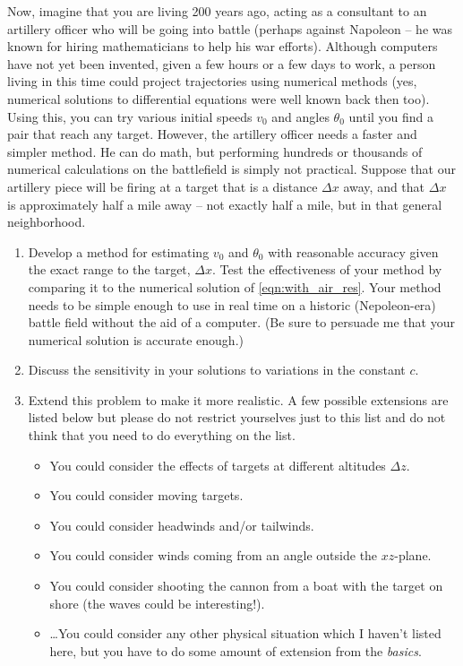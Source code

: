 Now, imagine that you are living 200 years ago, acting as a consultant to an artillery
officer who will be going into battle (perhaps against Napoleon -- he was known for hiring
mathematicians to help his war efforts). Although computers have
not yet been invented, given a few hours or a few days to work, a person living in this
time could project trajectories using numerical methods (yes, numerical solutions to differential
equations were well known back then too). Using this, you can try various
initial speeds $v_0$ and angles $\theta_0$ until you find a pair that reach any target. However, the
artillery officer needs a faster and simpler method. He can do math, but performing
hundreds or thousands of numerical calculations on the battlefield is simply not
practical. Suppose that our artillery piece will be firing at a target that is a distance
$\Delta x$ away, and that $\Delta x$ is approximately half a mile away -- not exactly half a mile, but in
that general neighborhood. 
\begin{enumerate}
    \item Develop a method for estimating $v_0$ and $\theta_0$ with reasonable
        accuracy given the exact range to the target, $\Delta x$.  Test the
        effectiveness of your method by comparing it to the numerical solution of
        \eqref{eqn:with_air_res}.  Your method needs to be simple enough to use in real
        time on a historic (Nepoleon-era)
        battle field without the aid of a computer.  (Be sure to persuade me that your numerical solution is accurate
        enough.) 
    \item Discuss the sensitivity in your solutions to variations in the constant $c$.
\item Extend this problem to make it more realistic.  A few possible extensions are
    listed below but please do not restrict yourselves just to this list and do not think
    that you need to do everything on the list.
    \begin{itemize}
        \item You could consider the effects of targets at different altitudes $\Delta z$.
        \item You could consider moving targets.
        \item You could consider headwinds and/or tailwinds.
        \item You could consider winds coming from an angle outside the $xz$-plane.
        \item You could consider shooting the cannon from a boat with the target on shore
            (the waves could be interesting!).
        \item \dots You could consider any other physical situation which I haven't listed
            here, but you have to do some amount of extension from the {\it basics}.
    \end{itemize}
\end{enumerate}

